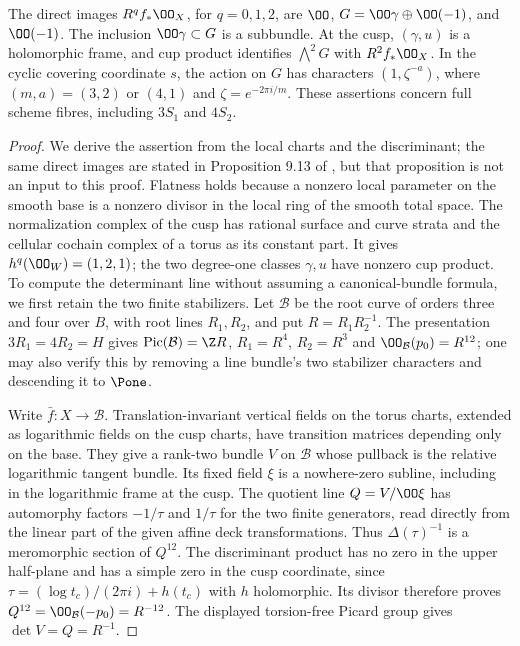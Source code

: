 \begin{proposition}\label{inv:A1.0}
The direct images $R^qf_*\OO_X$, for $q=0,1,2$, are
$\OO$, $G=\OO\gamma\oplus\OO(-1)$, and $\OO(-1)$.
The inclusion $\OO\gamma\subset G$ is a subbundle.  At the cusp,
$(\gamma,u)$ is a holomorphic frame, and cup product identifies
$\bigwedge^2G$ with $R^2f_*\OO_X$.  In the cyclic covering coordinate
$s$, the action on $G$ has characters $(1,\zeta^{-a})$, where
$(m,a)=(3,2)$ or $(4,1)$ and $\zeta=e^{-2\pi i/m}$.
These assertions concern full scheme fibres, including $3S_1$ and $4S_2$.
\end{proposition}
\begin{proof}
We derive the assertion from the local charts and the discriminant;
the same direct images are stated in Proposition 9.13 of
\citet{AC2026}, but that proposition is not an input to this proof.
Flatness holds
because a nonzero local parameter on the smooth base is a nonzero divisor
in the local ring of the smooth total space.  The normalization complex
of the cusp has rational surface and curve strata and the cellular
cochain complex of a torus as its constant part.  It gives
$h^q(\OO_W)=(1,2,1)$; the two degree-one classes $\gamma,u$ have nonzero
cup product.  To compute the determinant line without assuming a
canonical-bundle formula, we first retain the two finite stabilizers.
Let $\mathcal B$ be the root curve of orders three and four over $B$,
with root lines $R_1,R_2$, and put $R=R_1R_2^{-1}$.  The presentation
$3R_1=4R_2=H$ gives $\operatorname{Pic}(\mathcal B)=\Z R$,
$R_1=R^4$, $R_2=R^3$ and $\OO_{\mathcal B}(p_0)=R^{12}$;
one may also verify this by removing a line bundle's two stabilizer
characters and descending it to $\Pone$.

Write $\bar f:X\to\mathcal B$.  Translation-invariant vertical
fields on the torus charts, extended as logarithmic fields on the cusp
charts, have transition matrices depending only on the base.  They
give a rank-two bundle $V$ on $\mathcal B$ whose pullback is the
relative logarithmic tangent bundle.  Its fixed field $\xi$ is a
nowhere-zero subline, including in the logarithmic frame at the cusp.
The quotient line $Q=V/\OO\xi$ has automorphy factors $-1/\tau$
and $1/\tau$ for the two finite generators, read directly from the
linear part of the given affine deck transformations.  Thus
$\Delta(\tau)^{-1}$ is a meromorphic section of $Q^{12}$.
The discriminant product has no zero in the upper half-plane and
has a simple zero in the cusp coordinate, since
$\tau=(\log t_c)/(2\pi i)+h(t_c)$ with $h$ holomorphic.  Its divisor
therefore proves $Q^{12}=\OO_{\mathcal B}(-p_0)=R^{-12}$.
The displayed torsion-free Picard group gives
$\det V=Q=R^{-1}$.


\end{proof}
